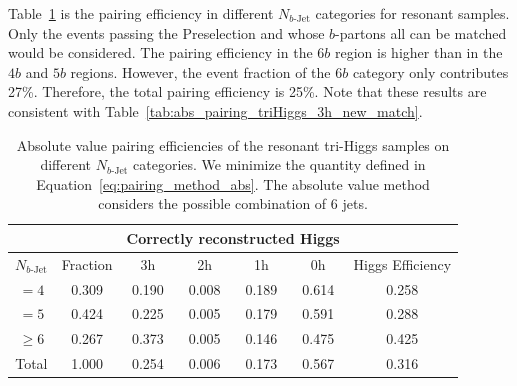 \documentclass[12pt]{article}
\begin{document}
    Table~\ref{tab:resonant_abs_pairing_3h_nbj} is the pairing efficiency in different $N_{b\text{-Jet}}$ categories for resonant samples. Only the events passing the Preselection and whose $b$-partons all can be matched would be considered. The pairing efficiency in the $6b$ region is higher than in the $4b$ and $5b$ regions. However, the event fraction of the $6b$ category only contributes 27\%. Therefore, the total pairing efficiency is 25\%. Note that these results are consistent with Table~\ref{tab:abs_pairing_triHiggs_3h_new_match}.
    \begin{table}[htpb]
        \centering
        \caption{Absolute value pairing efficiencies of the resonant tri-Higgs samples on different $N_{b\text{-Jet}}$ categories. We minimize the quantity defined in Equation~\ref{eq:pairing_method_abs}. The absolute value method considers the possible combination of 6 jets.}
        \label{tab:resonant_abs_pairing_3h_nbj}
        \begin{tabular}{c|c|cccc|c}
        \multicolumn{1}{l|}{} &          & \multicolumn{4}{c|}{Correctly reconstructed Higgs} & \multicolumn{1}{l}{} \\ \hline
        $N_{b\text{-Jet}}$    & Fraction & 3h          & 2h         & 1h         & 0h         & Higgs Efficiency     \\ \hline
        $=4$                  & 0.309 & 0.190 & 0.008 & 0.189 & 0.614 & 0.258 \\
        $=5$                  & 0.424 & 0.225 & 0.005 & 0.179 & 0.591 & 0.288 \\
        $\ge 6$               & 0.267 & 0.373 & 0.005 & 0.146 & 0.475 & 0.425 \\ \hline
        Total                 & 1.000 & 0.254 & 0.006 & 0.173 & 0.567 & 0.316
        \end{tabular}
    \end{table}
\end{document}
